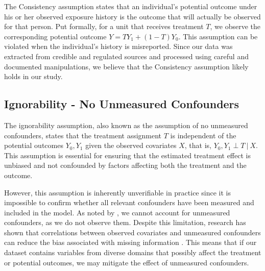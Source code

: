 \documentclass{article}
\newcommand{\gur}[1]{{\color{teal}{Gur: #1}}}
\begin{document}
The Consistency assumption states that an individual's potential outcome under his or her observed exposure history is the outcome that will actually be observed for that person. Put formally, for a unit that receives treatment $T$, we observe the corresponding potential outcome $Y = TY_1 + (1-T)Y_0$. This assumption can be violated when the individual's history is misreported. Since our data was extracted from credible and regulated sources and processed using careful and documented manipulations, we believe that the Consistency assumption likely holds in our study. 

\gur{elaborate more? Data Source Reliability, Clear Treatment Definition, Outcome Measurement, Data Processing Transparency, Stable Treatment}


\subsection{Ignorability - No Unmeasured Confounders}





The ignorability assumption, also known as the assumption of no unmeasured confounders, states that the treatment assignment \( T \) is independent of the potential outcomes \( Y_0, Y_1 \) given the observed covariates \( X \), that is, \( Y_0, Y_1 \perp T \ | \ X \). This assumption is essential for ensuring that the estimated treatment effect is unbiased and not confounded by factors affecting both the treatment and the outcome.

However, this assumption is inherently unverifiable in practice since it is impossible to confirm whether all relevant confounders have been measured and included in the model. As noted by \citet{hernan2006estimating}, we cannot account for unmeasured confounders, as we do not observe them. Despite this limitation, research has shown that correlations between observed covariates and unmeasured confounders can reduce the bias associated with missing information \citep{schulz2023no}. This means that if our dataset contains variables from diverse domains that possibly affect the treatment or potential outcomes, we may mitigate the effect of unmeasured confounders.
\end{document}

